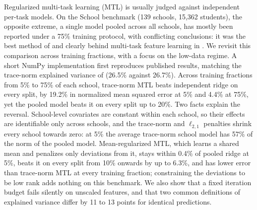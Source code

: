 Regularized multi-task learning (MTL) is usually judged against independent per-task models. On the School benchmark (139 schools, 15,362 students), the opposite extreme, a single model pooled across all schools, has mostly been reported under a 75\% training protocol, with conflicting conclusions: it was the best method of \citet{evgeniou2005kernel} and clearly behind multi-task feature learning in \citet{argyriou2008convex}. We revisit this comparison across training fractions, with a focus on the low-data regime. A short NumPy implementation first reproduces published results, matching the trace-norm explained variance of \citet{argyriou2008convex} (26.5\% against 26.7\%). Across training fractions from 5\% to 75\% of each school, trace-norm MTL beats independent ridge on every split, by 19.2\% in normalized mean squared error at 5\% and 4.4\% at 75\%, yet the pooled model beats it on every split up to 20\%. Two facts explain the reversal. School-level covariates are constant within each school, so their effects are identifiable only across schools, and the trace-norm and $\ell_{2,1}$ penalties shrink every school towards zero: at 5\% the average trace-norm school model has 57\% of the norm of the pooled model. Mean-regularized MTL, which learns a shared mean and penalizes only deviations from it, stays within 0.4\% of pooled ridge at 5\%, beats it on every split from 10\% onwards by up to 6.3\%, and has lower error than trace-norm MTL at every training fraction; constraining the deviations to be low rank adds nothing on this benchmark. We also show that a fixed iteration budget fails silently on unscaled features, and that two common definitions of explained variance differ by 11 to 13 points for identical predictions.
